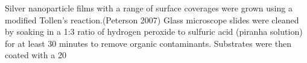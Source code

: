 Silver nanoparticle films with a range of surface coverages were grown using a modified Tollen’s reaction.(Peterson 2007) Glass microscope slides were cleaned by soaking in a 1:3 ratio of hydrogen peroxide to sulfuric acid (piranha solution) for at least 30 minutes to remove organic contaminants. Substrates were then coated with a 20%